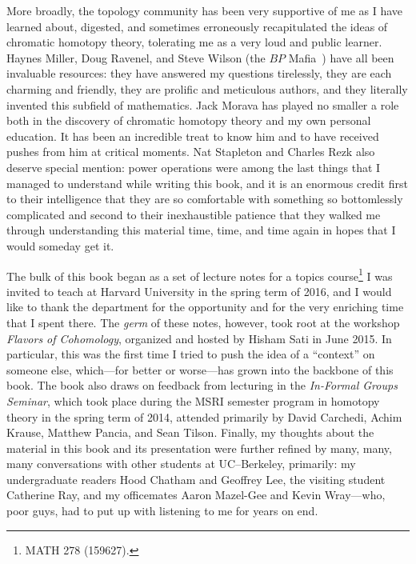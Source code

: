 More broadly, the topology community has been very supportive of me as I have learned about, digested, and sometimes erroneously recapitulated the ideas of chromatic homotopy theory, tolerating me as a very loud and public learner.  Haynes Miller, Doug Ravenel, and Steve Wilson (the $BP$ Mafia~\cite{HopkinsOnRavenel}) have all been invaluable resources: they have answered my questions tirelessly, they are each charming and friendly, they are prolific and meticulous authors, and they literally invented this subfield of mathematics.  Jack Morava has played no smaller a role both in the discovery of chromatic homotopy theory and my own personal education.  It has been an incredible treat to know him and to have received pushes from him at critical moments.  Nat Stapleton and Charles Rezk also deserve special mention: power operations were among the last things that I managed to understand while writing this book, and it is an enormous credit first to their intelligence that they are so comfortable with something so bottomlessly complicated and second to their inexhaustible patience that they walked me through understanding this material time, time, and time again in hopes that I would someday get it.

The bulk of this book began as a set of lecture notes for a topics course\footnote{MATH 278 (159627).} I was invited to teach at Harvard University in the spring term of 2016, and I would like to thank the department for the opportunity and for the very enriching time that I spent there.  The \emph{germ} of these notes, however, took root at the workshop \textit{Flavors of Cohomology}, organized and hosted by Hisham Sati in June 2015.  In particular, this was the first time I tried to push the idea of a ``context'' on someone else, which---for better or worse---has grown into the backbone of this book.  The book also draws on feedback from lecturing in the \textit{In-Formal Groups Seminar}, which took place during the MSRI semester program in homotopy theory in the spring term of 2014, attended primarily by David Carchedi, Achim Krause, Matthew Pancia, and Sean Tilson.  Finally, my thoughts about the material in this book and its presentation were further refined by many, many, many conversations with other students at UC--Berkeley, primarily: my undergraduate readers Hood Chatham and Geoffrey Lee, the visiting student Catherine Ray, and my officemates Aaron Mazel-Gee and Kevin Wray---who, poor guys, had to put up with listening to me for years on end.

